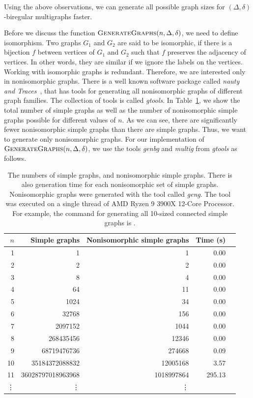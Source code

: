 Using the above observations, we can generate all possible graph sizes for $(\Delta, \delta)$-biregular multigraphs faster.

Before we discuss the function $\textsc{GenerateGraphs}(n, \Delta, \delta)$, we need to define isomorphism.
Two graphs $G_1$ and $G_2$ are said to be isomorphic, if there is a bijection $f$ between vertices of $G_1$ and $G_2$ such that $f$ preserves the adjacency of vertices.
In other words, they are similar if we ignore the labels on the vertices.
Working with isomorphic graphs is redundant.
Therefore, we are interested only in nonisomorphic graphs.
There is a well known software package called \emph{nauty and Traces}~\cite{DBLP:journals/jsc/McKayP14}, that has tools for generating all nonisomorphic graphs of different graph families.
The collection of tools is called \emph{gtools}.
In Table~\ref{tbl:graph_count_nonisomorphic}, we show the total number of simple graphs as well as the number of nonisomorphic simple graphs possible for different values of $n$.
As we can see, there are significantly fewer nonisomorphic simple graphs than there are simple graphs.
Thus, we want to generate only nonisomorphic graphs.
For our implementation of $\textsc{GenerateGraphs}(n, \Delta, \delta)$, we use the tools \emph{genbg} and \emph{multig} from \emph{gtools} as follows.

\begin{table}[H]
  \centering
  \begin{tabular}{r|r|rrr}
    \toprule
    $n$&Simple graphs & Nonisomorphic simple graphs & Time (s)\\
    \midrule
    1  &1                 & 1 & 0.00\\
    2  &2                 & 2 & 0.00\\
    3  &8                 & 4 & 0.00\\
    4  &64                & 11 & 0.00\\
    5  &1024              & 34 & 0.00\\
    6  &32768             & 156 & 0.00\\
    7  &2097152           & 1044 & 0.00\\
    8  &268435456         & 12346 & 0.00\\
    9  &68719476736       & 274668   & 0.09\\
    10 &35184372088832    & 12005168 & 3.57\\
    11 &36028797018963968 &1018997864&295.13\\
    \vdots & \vdots &\vdots\\
    \bottomrule
  \end{tabular}
  \caption{%
    The numbers of simple graphs, and nonisomorphic simple graphs.
    There is also generation time for each nonisomorphic set of simple graphs.
    Nonisomorphic graphs were generated with the tool called \emph{geng}.
    The tool was executed on a single thread of AMD Ryzen 9 3900X 12-Core Processor.
    For example, the command for generating all 10-sized connected simple graphs is .
  }
  \label{tbl:graph_count_nonisomorphic}
\end{table}

